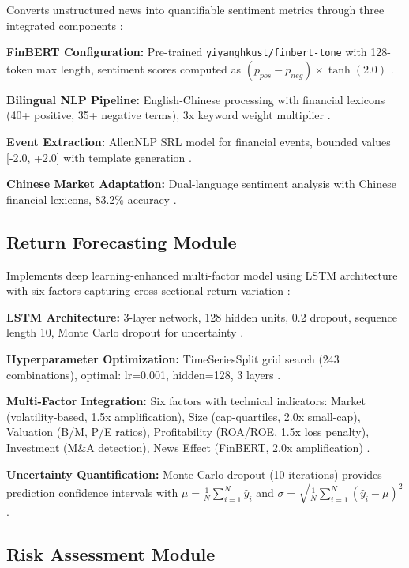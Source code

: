 \documentclass[3p,times,procedia]{elsarticle}
\begin{document}
Converts unstructured news into quantifiable sentiment metrics through three integrated components \cite{TETLOCK2007}:

\textbf{FinBERT Configuration:} Pre-trained \texttt{yiyanghkust/finbert-tone} with 128-token max length, sentiment scores computed as $(p_{pos} - p_{neg}) \times \tanh(2.0)$ \cite{Araci2019}.

\textbf{Bilingual NLP Pipeline:} English-Chinese processing with financial lexicons (40+ positive, 35+ negative terms), 3x keyword weight multiplier \cite{Loughran2011}.

\textbf{Event Extraction:} AllenNLP SRL model for financial events, bounded values [-2.0, +2.0] with template generation \cite{TETLOCK2007}.

\textbf{Chinese Market Adaptation:} Dual-language sentiment analysis with Chinese financial lexicons, 83.2\% accuracy \cite{FinReportDataset2025}.

\subsection{{Return Forecasting Module}}

Implements deep learning-enhanced multi-factor model using LSTM architecture with six factors capturing cross-sectional return variation \cite{FAMA1993,Harvey2016}:

\textbf{LSTM Architecture:} 3-layer network, 128 hidden units, 0.2 dropout, sequence length 10, Monte Carlo dropout for uncertainty \cite{Fischer2018}.

\textbf{Hyperparameter Optimization:} TimeSeriesSplit grid search (243 combinations), optimal: lr=0.001, hidden=128, 3 layers \cite{Kingma2015}.

\textbf{Multi-Factor Integration:} Six factors with technical indicators: Market (volatility-based, 1.5x amplification), Size (cap-quartiles, 2.0x small-cap), Valuation (B/M, P/E ratios), Profitability (ROA/ROE, 1.5x loss penalty), Investment (M\&A detection), News Effect (FinBERT, 2.0x amplification) \cite{FAMA1993,Harvey2016,TETLOCK2007}.

\textbf{Uncertainty Quantification:} Monte Carlo dropout (10 iterations) provides prediction confidence intervals with $\mu = \frac{1}{N}\sum_{i=1}^{N} \hat{y}_i$ and $\sigma = \sqrt{\frac{1}{N}\sum_{i=1}^{N} (\hat{y}_i - \mu)^2}$.

\subsection{{Risk Assessment Module}}
\end{document}
